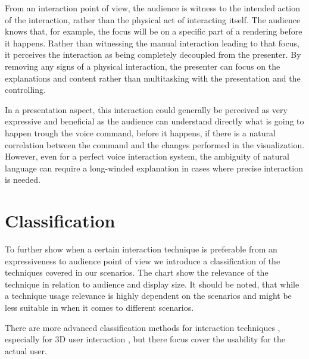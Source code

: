 \documentclass[review,journal]{vgtc}         %
\begin{document}
From an interaction point of view, the audience is witness to the intended action of the interaction, rather than the physical act of interacting itself.
The audience knows that, for example, the focus will be on a specific part of a rendering before it happens.
Rather than witnessing the manual interaction leading to that focus, it perceives the interaction as being completely decoupled from the presenter.
By removing any signs of a physical interaction, the presenter can focus on the explanations and content rather than multitasking with the presentation and the controlling.

In a presentation aspect, this interaction could generally be perceived as very expressive and beneficial as the audience can understand directly what is going to happen trough the voice command, before it happens, if there is a natural correlation between the command and the changes performed in the visualization. However, even for a perfect voice interaction system, the ambiguity of natural language can require a long-winded explanation in cases where precise interaction is needed.

\section{Classification} \label{sec:classification}

To further show when a certain interaction technique is preferable from an expressiveness to audience point of view we introduce a classification of the techniques covered in our scenarios. The chart show the relevance of the technique in relation to audience and display size. It should be noted, that while a technique usage relevance is highly dependent on the scenarios and might be less suitable in when it comes to different scenarios.


There are more advanced classification methods for interaction techniques \cite{stars:65-93:2012}, especially for 3D user interaction \cite{CGF:CGF194, Kettner95aclassification, 978-3-319-07458-0_1}, but there focus cover the usability for the actual user.
\end{document}
